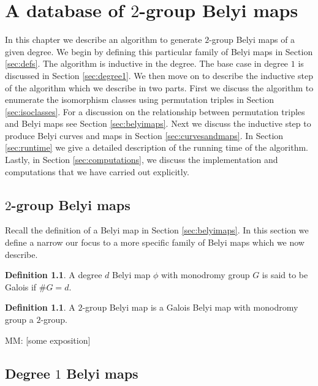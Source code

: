 \documentclass{dcthesis}
\newcommand{\defi}[1]{\textsf{#1}}
\newcommand{\mm}[1]{{\color{blue} \sf MM: [#1]}}
\theoremstyle{definition}
\newtheorem{definition}[prop]{Definition}
\theoremstyle{remark}
\numberwithin{equation}{section}
\numberwithin{figure}{section}
\begin{document}
\chapter{A database of $2$-group Belyi maps}{\label{chapter:database}
  In this chapter we describe an algorithm
  to generate $2$-group Belyi maps of a given degree.
  We begin by defining this particular family of Belyi maps in Section \ref{sec:defs}.
  The algorithm is inductive in the degree.
  The base case in degree $1$ is discussed in Section \ref{sec:degree1}.
  We then move on to describe the inductive step of the algorithm
  which we describe in two parts.
  First we discuss the algorithm to enumerate the isomorphism classes
  using permutation triples in Section \ref{sec:isoclasses}.
  For a discussion on the relationship between permutation triples and Belyi maps
  see Section \ref{sec:belyimaps}.
  Next we discuss the inductive step to produce Belyi curves and maps in Section \ref{sec:curvesandmaps}.
  In Section \ref{sec:runtime} we give a detailed description of the running time of the algorithm.
  Lastly,
  in Section \ref{sec:computations},
  we discuss the implementation and computations that we have carried out explicitly.
  \section{$2$-group Belyi maps}{\label{sec:defs}
    Recall the definition of a Belyi map in Section \ref{sec:belyimaps}.
    In this section we define a narrow our focus to a more specific family of Belyi maps
    which we now describe.
    \begin{definition}\label{def:galois}
      A degree $d$ Belyi map $\phi$ with monodromy group $G$
      is said to be \defi{Galois} if $\#G = d$.
    \end{definition}
    \begin{definition}\label{def:2groupbelyi}
      A \defi{$2$-group Belyi map} is a Galois Belyi map
      with monodromy group a $2$-group.
    \end{definition}
    \mm{some exposition}
  }
  \section{Degree $1$ Belyi maps}{\label{sec:degree1}
  }
}
\end{document}

